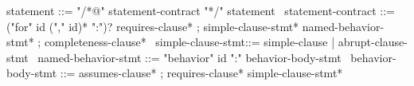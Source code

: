 \begin{syntax}
  statement ::= "/*@" statement-contract "*/" statement
  \
  statement-contract ::= ("for" id ("," id)* ":")? requires-clause* ;
    simple-clause-stmt* named-behavior-stmt* ;
    completeness-clause*
  \
  simple-clause-stmt::= simple-clause | abrupt-clause-stmt
  \
  named-behavior-stmt ::= "behavior" id ":" behavior-body-stmt
  \
  behavior-body-stmt ::= assumes-clause* ;
       requires-clause* simple-clause-stmt*
\end{syntax}
